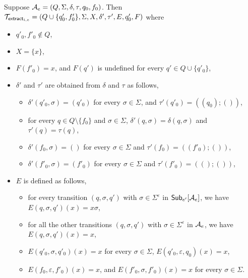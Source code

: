 Suppose $\mathcal{A}_e = (Q, \Sigma, \delta, \tau, q_0, f_0)$. Then $\mathcal{T}_{\mathsf{extract}_{i,e}} = (Q \cup \{q'_0, f'_0\}, \Sigma, X, \delta', \tau', E, q'_0, F)$ where
\begin{itemize}
\item $q'_0, f'_0 \not \in Q$,

\item  $X = \{x\}$,
%
\item $F(f'_0) = x$, and $F(q')$ is undefined for every $q' \in Q \cup \{q'_0\}$,

\item $\delta'$ and $\tau'$ are obtained from $\delta$ and $\tau$ as follows,
\begin{itemize}
\item $\delta'(q'_0, \sigma) = (q'_0)$ for every $\sigma \in \Sigma$, and $\tau'(q'_0) = ((q_0); ())$,
%
\item  for every $q \in Q \setminus \{f_0\}$ and $\sigma \in \Sigma$, $\delta'(q, \sigma) = \delta(q, \sigma)$ and $\tau'(q) = \tau(q)$, 
%
\item $\delta'(f_0, \sigma) = ()$ for every $\sigma \in \Sigma$ and $\tau'(f_0) = ((f'_0); ())$,
%
\item $\delta'(f'_0, \sigma) = (f'_0)$ for every $\sigma \in \Sigma$ and $\tau'(f'_0) = ((); ())$,
\end{itemize}
%
\item $E$ is defined as follows, 
\begin{itemize}
\item for every transition $(q, \sigma, q')$ with  $\sigma \in \Sigma^\varepsilon$ in ${\sf Sub}_{e'}[\mathcal{A}_e]$, we have $E(q, \sigma, q')(x) = x\sigma$, 
\item for all the other transitions $(q, \sigma, q')$ with $\sigma \in \Sigma^\varepsilon$ in $\mathcal{A}_e$, we have $E(q, \sigma, q')(x) = x$, 
\item $E(q'_0, \sigma, q'_0)(x) = x$ for every $\sigma \in \Sigma$, $E(q'_0, \varepsilon, q_0)(x) = x$, 
\item $E(f_0, \varepsilon, f'_0)(x) = x$, and $E(f'_0, \sigma, f'_0)(x) = x$ for every $\sigma \in \Sigma$.
\end{itemize}
%
\end{itemize}


